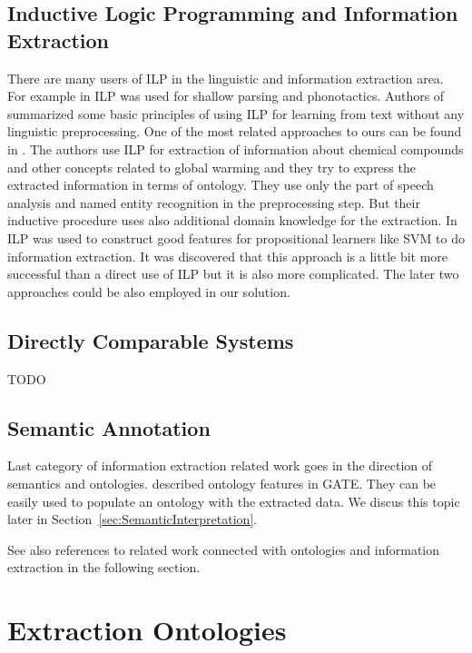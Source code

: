 \subsection{Inductive Logic Programming and Information Extraction}
There are many users of ILP in the linguistic and information extraction area.
For example in \citep{stasinos:phd} ILP was used for shallow parsing and phonotactics.
Authors of \citep{Junker99learningfor} summarized some basic principles of using ILP for learning from text without any linguistic preprocessing. One of the most related approaches to ours can be found in \citep{aitken02:_learn_infor_extrac_rules}. The authors use ILP for extraction of information about chemical compounds and other concepts related to global warming and they try to express the extracted information in terms of ontology. They use only the part of speech analysis and named entity recognition in the preprocessing step. But their inductive procedure uses also additional domain knowledge for the extraction. In \citep{DBLP:conf/ilp/RamakrishnanJBS07} ILP was used to construct good features for propositional learners like SVM to do information extraction. It was discovered that this approach is a little bit more successful than a direct use of ILP but it is also more complicated. The later two approaches could be also employed in our solution.


\subsection{Directly Comparable Systems} \label{sec:relwork_directly_comparable}

TODO

\subsection{Semantic Annotation}
Last category of information extraction related work goes in the direction of semantics and ontologies. \cite{Bon04b} described  ontology features in GATE. They can be easily used to populate an ontology with the extracted data. We discus this topic later in Section~\ref{sec:SemanticInterpretation}.

See also references to related work connected with ontologies and information extraction in the following section. 


\section{Extraction Ontologies} \label{sec:relwork_ext_ont}

